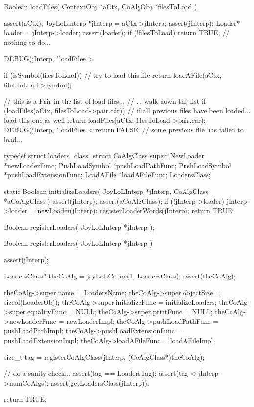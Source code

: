\starttyping
Boolean loadFiles(
  ContextObj *aCtx,
  CoAlgObj   *filesToLoad
) {
  assert(aCtx);
  JoyLoLInterp *jInterp = aCtx->jInterp;
  assert(jInterp);
  Loader* loader = jInterp->loader;
  assert(loader);
  if (!filesToLoad) return TRUE; // nothing to do...

  DEBUG(jInterp, "loadFiles > %

  if (isSymbol(filesToLoad)) { // try to load this file
    return loadAFile(aCtx, filesToLoad->symbol);
  }

  // this is a Pair in the list of load files...
  // ... walk down the list
  if (loadFiles(aCtx, filesToLoad->pair.cdr)) {
    // if all previous files have been loaded... load this one as well
    return loadFiles(aCtx, filesToLoad->pair.car);
  }
  DEBUG(jInterp, "loadFiles < %
  return FALSE; // some previous file has failed to load...
}
\stoptyping

\startTestSuite[regiserLoaders]

\startCHeader
typedef struct loaders_class_struct {
  CoAlgClass      super;
  NewLoader      *newLoaderFunc;
  PushLoadSymbol *pushLoadPathFunc;
  PushLoadSymbol *pushLoadExtensionFunc;
  LoadAFile      *loadAFileFunc;
} LoadersClass;
\stopCHeader

\startCCode
static Boolean initializeLoaders(
  JoyLoLInterp *jInterp,
  CoAlgClass   *aCoAlgClass
) {
  assert(jInterp);
  assert(aCoAlgClass);
  if (!jInterp->loader) {
    jInterp->loader = newLoader(jInterp);
  }
  registerLoaderWords(jInterp);
  return TRUE;
}
\stopCCode

\startCHeader
Boolean registerLoaders(
  JoyLoLInterp *jInterp
);
\stopCHeader
{}

\startCCode
Boolean registerLoaders(
  JoyLoLInterp *jInterp
) {
  assert(jInterp);
  
  LoadersClass* theCoAlg =
    joyLoLCalloc(1, LoadersClass);
  assert(theCoAlg);
  
  theCoAlg->super.name            = LoadersName;
  theCoAlg->super.objectSize      = sizeof(LoaderObj);
  theCoAlg->super.initializeFunc  = initializeLoaders;
  theCoAlg->super.equalityFunc    = NULL;
  theCoAlg->super.printFunc       = NULL;
  theCoAlg->newLoaderFunc         = newLoaderImpl;
  theCoAlg->pushLoadPathFunc      = pushLoadPathImpl;
  theCoAlg->pushLoadExtensionFunc = pushLoadExtensionImpl;
  theCoAlg->loadAFileFunc         = loadAFileImpl;

  size_t tag =
    registerCoAlgClass(jInterp, (CoAlgClass*)theCoAlg);
  
  // do a sanity check...
  assert(tag == LoadersTag);
  assert(tag < jInterp->numCoAlgs);
  assert(getLoadersClass(jInterp));

  return TRUE;
}
\stopCCode

